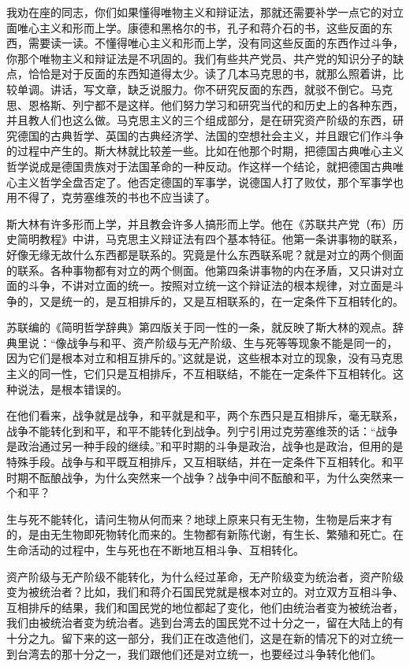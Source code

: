 我劝在座的同志，你们如果懂得唯物主义和辩证法，那就还需要补学一点它的对立面唯心主义和形而上学。康德和黑格尔的书，孔子和蒋介石的书，这些反面的东西，需要读一读。不懂得唯心主义和形而上学，没有同这些反面的东西作过斗争，你那个唯物主义和辩证法是不巩固的。我们有些共产党员、共产党的知识分子的缺点，恰恰是对于反面的东西知道得太少。读了几本马克思的书，就那么照着讲，比较单调。讲话，写文章，缺乏说服力。你不研究反面的东西，就驳不倒它。马克思、恩格斯、列宁都不是这样。他们努力学习和研究当代的和历史上的各种东西，并且教人们也这么做。马克思主义的三个组成部分，是在研究资产阶级的东西，研究德国的古典哲学、英国的古典经济学、法国的空想社会主义，并且跟它们作斗争的过程中产生的。斯大林就比较差一些。比如在他那个时期，把德国古典唯心主义哲学说成是德国贵族对于法国革命的一种反动。作这样一个结论，就把德国古典唯心主义哲学全盘否定了。他否定德国的军事学，说德国人打了败仗，那个军事学也用不得了，克劳塞维茨的书也不应当读了。

斯大林有许多形而上学，并且教会许多人搞形而上学。他在《苏联共产党（布）历史简明教程》中讲，马克思主义辩证法有四个基本特征。他第一条讲事物的联系，好像无缘无故什么东西都是联系的。究竟是什么东西联系呢？就是对立的两个侧面的联系。各种事物都有对立的两个侧面。他第四条讲事物的内在矛盾，又只讲对立面的斗争，不讲对立面的统一。按照对立统一这个辩证法的根本规律，对立面是斗争的，又是统一的，是互相排斥的，又是互相联系的，在一定条件下互相转化的。

苏联编的《简明哲学辞典》第四版关于同一性的一条，就反映了斯大林的观点。辞典里说：“像战争与和平、资产阶级与无产阶级、生与死等等现象不能是同一的，因为它们是根本对立和相互排斥的。”这就是说，这些根本对立的现象，没有马克思主义的同一性，它们只是互相排斥，不互相联结，不能在一定条件下互相转化。这种说法，是根本错误的。

在他们看来，战争就是战争，和平就是和平，两个东西只是互相排斥，毫无联系，战争不能转化到和平，和平不能转化到战争。列宁引用过克劳塞维茨的话：“战争是政治通过另一种手段的继续。”和平时期的斗争是政治，战争也是政治，但用的是特殊手段。战争与和平既互相排斥，又互相联结，并在一定条件下互相转化。和平时期不酝酿战争，为什么突然来一个战争？战争中间不酝酿和平，为什么突然来一个和平？

生与死不能转化，请问生物从何而来？地球上原来只有无生物，生物是后来才有的，是由无生物即死物转化而来的。生物都有新陈代谢，有生长、繁殖和死亡。在生命活动的过程中，生与死也在不断地互相斗争、互相转化。

资产阶级与无产阶级不能转化，为什么经过革命，无产阶级变为统治者，资产阶级变为被统治者？比如，我们和蒋介石国民党就是根本对立的。对立双方互相斗争、互相排斥的结果，我们和国民党的地位都起了变化，他们由统治者变为被统治者，我们由被统治者变为统治者。逃到台湾去的国民党不过十分之一，留在大陆上的有十分之九。留下来的这一部分，我们正在改造他们，这是在新的情况下的对立统一到台湾去的那十分之一，我们跟他们还是对立统一，也要经过斗争转化他们。

